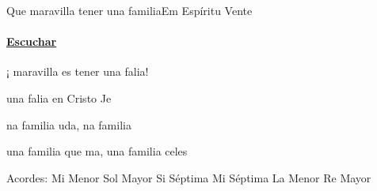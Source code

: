 \documentclass[12pt, spanish]{book}
\begin{document}
    \begin{song}{Que maravilla tener una familia}{Em}
    {} %
    {Espíritu Vente}
    {} %
    {}
        \ifChordBk
        \paragraph{\mbox{}\hfill\protect\href{https://open.spotify.com/intl-es/track/6dVkwsH1ZrHJdGsqArV8GO}{Escuchar}\mbox{}\hfill}
        \fi


        \begin{SBOpGroup}
            ¡  maravilla es tener una falia!

            una falia en Cristo Je~
        \end{SBOpGroup}

        \begin{SBChorus}
            na familia uda, na familia 

            una familia que ma, una familia celes
        \end{SBChorus}

        \ifChordBk
        \begin{SBOpGroup}
            Acordes:
            \upchord{\Em}\qquad Mi Menor \hfill
            \upchord{\G}\qquad Sol Mayor \hfill\null\break
            \upchord{\Bseven}\qquad Si S\'eptima \hfill
            \upchord{\Eseven}\qquad Mi S\'eptima \hfill
            \upchord{\Am}\qquad La Menor \hfill\null\break
            \upchord{\D}\qquad Re Mayor \hfill
        \end{SBOpGroup}
        \fi
    \end{song}
\end{document}
